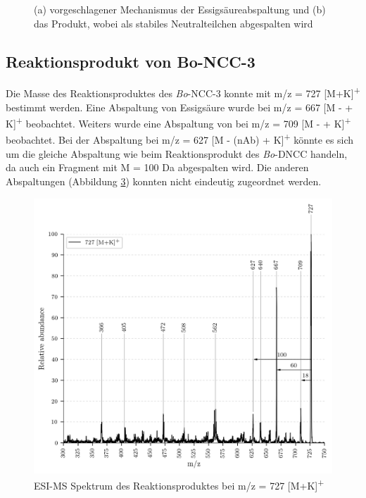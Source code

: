 \begin{figure}[!htbp]
\begin{subfigure}[b]{0.5\textwidth}
    \caption{}
    \label{fig:699MK639}
  \end{subfigure}
  \caption[Vorschlag des Mechanismus der  Abspaltung, Quelle: Autor]{(a) vorgeschlagener Mechanismus der Essigsäureabspaltung und (b) das Produkt, wobei  als stabiles Neutralteilchen abgespalten wird}
\end{figure}



\pagebreak
\subsection{Reaktionsprodukt von Bo-NCC-3}

Die Masse des Reaktionsproduktes des \textit{Bo}-NCC-3 konnte mit m/z = 727 [M+K]\textsuperscript{+} bestimmt werden. Eine Abspaltung von Essigsäure wurde bei m/z = 667 [M -  + K]\textsuperscript{+} beobachtet. Weiters wurde eine Abspaltung von  bei m/z = 709 [M -  + K]\textsuperscript{+} beobachtet. Bei der Abspaltung bei m/z = 627 [M - (\gls{nAb}) + K]\textsuperscript{+} könnte es sich um die gleiche Abspaltung wie beim Reaktionsprodukt des \textit{Bo}-DNCC handeln, da auch ein Fragment mit M = 100 Da abgespalten wird. Die anderen Abspaltungen (Abbildung \ref{fig:727MKLeafspray}) konnten nicht eindeutig zugeordnet werden.

\begin{figure}[!htbp]
  \centering
  \includegraphics[width=\textwidth, height=0.7\textwidth]{figures/Kapitel4/Kataboliten/VWA_MS_LeafSpray_727.png}
  \caption[ESI-MS des Reaktionsproduktes von Bo-NCC-3, Quelle: Autor]{ESI-MS Spektrum des Reaktionsproduktes bei m/z = 727 [M+K]\textsuperscript{+}}
  \label{fig:727MKLeafspray}
\end{figure}


